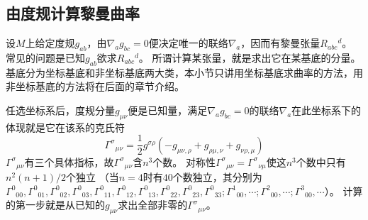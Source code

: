 \subsection{由度规计算黎曼曲率}

设$M$上给定度规$g_{ab}$，由$\nabla_ag_{bc} = 0$便决定唯一的联络$\nabla_a$，因而有黎曼张量$R_{abc}{}^d$。
常见的问题是已知$g_{ab}$欲求$R_{abc}{}^d$。
所谓计算某张量，就是求出它在某基底的分量。
基底分为坐标基底和非坐标基底两大类，本小节只讲用坐标基底求曲率的方法，用非坐标基底的方法将在后面的章节介绍。

任选坐标系后，度规分量$g_{\mu\nu}$便是已知量，满足$\nabla_ag_{bc} = 0$的联络$\nabla_a$在此坐标系下的体现就是它在该系的克氏符
$$\Gamma^\sigma{}_{\mu\nu} = \frac{1}{2}g^{\sigma\rho}(-g_{\mu\nu,\rho} + g_{\rho\mu,\nu} + g_{\nu\rho,\mu})$$
$\Gamma^\sigma{}_{\mu\nu}$有三个具体指标，故${\Gamma^\sigma{}_{\mu\nu}}$含$n^3$个数。
对称性$\Gamma^\sigma{}_{\mu\nu} = \Gamma^\sigma{}_{\nu\mu}$使这$n^3$个数中只有$n^2(n + 1)/2$个独立
（当$n = 4$时有$40$个数独立，其分别为$\Gamma^0{}_{00}, \Gamma^0{}_{01}, \Gamma^0{}_{02}, \Gamma^0{}_{03}, \Gamma^0{}_{11}, \Gamma^0{}_{12}, \Gamma^0{}_{13}, \Gamma^0{}_{22}, \Gamma^0{}_{23}, \Gamma^0{}_{33}; \Gamma^1{}_{00}, \cdots; \Gamma^2{}_{00}, \cdots; \Gamma^3{}_{00}, \cdots$）。
计算的第一步就是从已知的$g_{\mu\nu}$求出全部非零的$\Gamma^\sigma{}_{\mu\nu}$。

